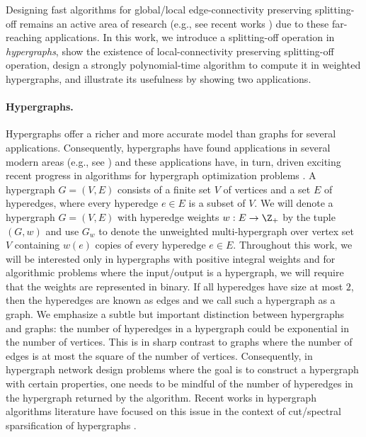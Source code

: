 \documentclass{article}
\begin{document}
Designing fast algorithms for global/local edge-connectivity preserving splitting-off remains an active area of research (e.g., see recent works \cite{LY13, CLP22-soda, CLP22-stoc, CHLP23}) due to these far-reaching applications. 
In this work, we introduce a splitting-off operation in \emph{hypergraphs}, show the existence of local-connectivity preserving splitting-off operation, design a strongly polynomial-time algorithm to compute it in weighted hypergraphs, and illustrate its usefulness by showing two applications. 

\paragraph{Hypergraphs.}
Hypergraphs offer a richer and more accurate model than graphs for several applications. 
Consequently, hypergraphs have found applications in several modern areas (e.g., see \cite{VeldtBK22,Schlagetal23,LiM17, Ornes21}) and these applications have, in turn, driven exciting recent progress in algorithms for hypergraph optimization problems \cite{KK15, GKP17, CXY19-j, CX18, CC22, CKN20, SY19, BST19, KKTY21-FOCS, KKTY21-STOC, Lee22, JLS22, Quanrud22, GLSTW22, CC23, AGL23, FPZ23}. 
A hypergraph $G=(V, E)$ consists of a finite set $V$ of vertices and a set $E$ of hyperedges, where every hyperedge $e\in E$ is a subset of $V$. We will denote a hypergraph $G=(V, E)$ with hyperedge weights $w: E\rightarrow \Z_+$ by the tuple $(G, w)$ and use $G_w$ to denote the unweighted multi-hypergraph over vertex set $V$ containing $w(e)$ copies of every hyperedge $e\in E$.  
Throughout this work, we will be interested only in hypergraphs with positive integral weights and for algorithmic problems where the input/output is a hypergraph, we will require that the weights are represented in binary. 
If all hyperedges have size at most $2$, then the hyperedges are known as edges and we call such a hypergraph as a graph. 
We emphasize a subtle but important distinction between hypergraphs and graphs: the number of hyperedges in a hypergraph could be exponential in the number of vertices. This is in sharp contrast to graphs where the number of edges is at most the square of the number of vertices. Consequently, in hypergraph network design problems where the goal is to construct a hypergraph with certain properties,  
one needs to be mindful of the number of hyperedges in the hypergraph returned by the algorithm. %
Recent works in hypergraph algorithms literature have 
focused on this 
issue in the context of cut/spectral sparsification of hypergraphs \cite{KK15, CX18, SY19, BST19, CKN20, KKTY21-FOCS, KKTY21-STOC, Lee22, JLS22, Quanrud22}. 
\end{document}
